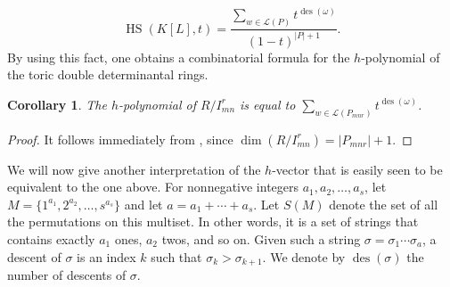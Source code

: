 \documentclass[12pt]{amsart}
\numberwithin{equation}{section}
\newtheorem{corollary}[theorem]{Corollary}
\theoremstyle{definition}
\DeclareMathOperator{\des}{des}
\DeclareMathOperator{\HS}{HS}
\begin{document}
\begin{equation}
\label{eq:Hilbert_series}
\HS(K[L],t)=\frac{\sum_{w \in \mathcal{L}(P)}t^{\operatorname{des}(\omega)}}{(1-t)^{|P|+1}}.
\end{equation}
By using this fact, one obtains a combinatorial formula for the $h$-polynomial of the toric double determinantal rings.
\begin{corollary}
    The $h$-polynomial of $R/I_{mn}^r$ is equal to $\sum_{w \in \mathcal{L}(P_{mnr})}t^{\operatorname{des}(\omega)}$.
\end{corollary}
\begin{proof}
    It follows immediately from , since $\dim(R/I_{mn}^r)=|P_{mnr}|+1$.
\end{proof}
We will now give another interpretation of the $h$-vector that is easily seen to be equivalent to the one above.
For nonnegative integers $a_1,a_2,\ldots,a_s$, let $M=\{1^{a_1},2^{a_2},\ldots, s^{a_s}\}$ and let $a=a_1+\cdots+a_s$. Let $S(M)$ denote the set of all the permutations on this multiset. In other words, it is a set of strings that contains exactly $a_1$ ones, $a_2$ twos, and so on. 
Given such a string $\sigma=\sigma_1\cdots \sigma_a$, a descent of $\sigma$ is an index $k$ such that $\sigma_{k}>\sigma_{k+1}$.  We denote by $\des(\sigma)$ the number of descents of $\sigma$. 
\end{document}
